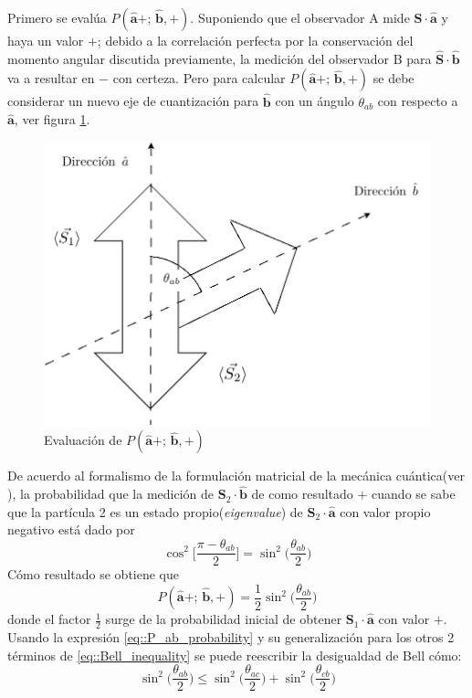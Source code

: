 \documentclass[a4paper]{article}
\begin{document}
Primero se evalúa $P(\mathbf{\hat{a}}+;\, \mathbf{\hat{b}},+)$. Suponiendo que el observador A mide $\mathbf{\hat{S}} \cdot \mathbf{\hat{a}}$ y haya un valor $+$; debido a la correlación perfecta por la conservación del momento angular discutida previamente, la medición del observador B para $\mathbf{\hat{S}} \cdot \mathbf{\hat{b}}$ va a resultar en $-$ con certeza. Pero para calcular $P(\mathbf{\hat{a}}+;\, \mathbf{\hat{b}},+)$ se debe considerar un nuevo eje de cuantización para $\mathbf{\hat{b}}$ con un ángulo $\theta_{ab}$ con respecto a $\mathbf{\hat{a}}$, ver figura \ref{fig::P_evaluation}. 
\begin{figure}[h]
\begin{center}
\includegraphics[scale=0.24]{./evaluation_P.png} 
\end{center} 
\caption{Evaluación de $P(\mathbf{\hat{a}}+;\, \mathbf{\hat{b}},+)$}
\label{fig::P_evaluation}
\end{figure}
De acuerdo al formalismo de la formulación matricial de la mecánica cuántica(ver \cite{Sakurai}), la probabilidad que la medición de $\mathbf{S}_2\cdot \mathbf{\hat{b}}$ de como resultado $+$ cuando se sabe que la partícula 2 es un estado propio(\textit{eigenvalue}) de $\mathbf{S}_2\cdot \mathbf{\hat{a}}$ con valor propio negativo está dado por
\begin{equation}
\cos^2\Bigg[\frac{\pi-\theta_{ab}}{2}\Bigg]=\sin^2\bigg(\frac{\theta_{ab}}{2}\bigg)
\end{equation}
Cómo resultado se obtiene que 
\begin{equation}\label{eq::P_ab_probability}
P(\mathbf{\hat{a}}+;\, \mathbf{\hat{b}},+)=\frac{1}{2}\sin^2\bigg(\frac{\theta_{ab}}{2}\bigg)
\end{equation}
donde el factor $\frac{1}{2}$ surge de la probabilidad inicial de obtener $\mathbf{S}_1\cdot \mathbf{\hat{a}}$ con valor $+$. Usando la expresión \ref{eq::P_ab_probability} y su generalización para los otros 2 términos de \ref{eq::Bell_inequality} se puede reescribir la desigualdad de Bell cómo:
\begin{equation}\label{eq::Bell_inequality_2}
\sin^2\bigg(\frac{\theta_{ab}}{2}\bigg)\leq \sin^2\bigg(\frac{\theta_{ac}}{2}\bigg)+\sin^2\bigg(\frac{\theta_{cb}}{2}\bigg)
\end{equation}
\end{document}
